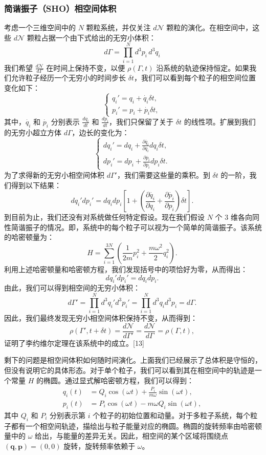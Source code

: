 \subsubsection{简谐振子（SHO）相空间体积}
考虑一个三维空间中的 \(N\) 颗粒系统，并仅关注 \(d\mathcal{N}\) 颗粒的演化。在相空间中，这些 \(d\mathcal{N}\) 颗粒占据一个由下式给出的无穷小体积：
\[
d\Gamma = \prod_{i=1}^{N} d^3p_i \, d^3q_i~
\]
我们希望 \( \frac{d\mathcal{N}}{d\Gamma} \) 在时间上保持不变，以便 \( \rho(\Gamma, t) \) 沿系统的轨迹保持恒定。如果我们允许粒子经历一个无穷小的时间步长 \( \delta t \)，我们可以看到每个粒子的相空间位置变化如下：
\[
\begin{cases}
q_i' = q_i + \dot{q_i} \delta t, \\
p_i' = p_i + \dot{p_i} \delta t,
\end{cases}~
\]
其中，\( \dot{q_i} \) 和 \( \dot{p_i} \) 分别表示 \( \frac{dq_i}{dt} \) 和 \( \frac{dp_i}{dt} \)，我们只保留了关于 \( \delta t \) 的线性项。扩展到我们的无穷小超立方体 \( d\Gamma \)，边长的变化为：
\[
\begin{cases}
dq_i' = dq_i + \frac{\partial \dot{q_i}}{\partial q_i} dq_i \delta t, \\
dp_i' = dp_i + \frac{\partial \dot{p_i}}{\partial p_i} dp_i \delta t.
\end{cases}~
\]
为了求得新的无穷小相空间体积 \( d\Gamma' \)，我们需要这些量的乘积。到 \( \delta t \) 的一阶，我们得到以下结果：
\[
dq_i' dp_i' = dq_i dp_i \left[1 + \left( \frac{\partial \dot{q_i}}{\partial q_i} + \frac{\partial \dot{p_i}}{\partial p_i} \right) \delta t \right].~
\]
到目前为止，我们还没有对系统做任何特定假设。现在我们假设 \( N \) 个 3 维各向同性简谐振子的情况。即，系统中的每个粒子可以视为一个简单的简谐振子。该系统的哈密顿量为：
\[
H = \sum_{i=1}^{3N} \left( \frac{1}{2m} p_i^2 + \frac{m\omega^2}{2} q_i^2 \right).~
\]
利用上述哈密顿量和哈密顿方程，我们发现括号中的项恰好为零，从而得出：
\[
dq_i' dp_i' = dq_i dp_i.~
\]
由此，我们可以得到相空间的无穷小体积：
\[
d\Gamma' = \prod_{i=1}^{N} d^3q_i' d^3p_i' = \prod_{i=1}^{N} d^3q_i d^3p_i = d\Gamma.~
\]
因此，我们最终发现无穷小相空间体积保持不变，从而得到：
\[
\rho(\Gamma', t + \delta t) = \frac{d\mathcal{N}}{d\Gamma'} = \frac{d\mathcal{N}}{d\Gamma} = \rho(\Gamma, t),~
\]
证明了李约维尔定理在该系统中的成立。[13]

剩下的问题是相空间体积如何随时间演化。上面我们已经展示了总体积是守恒的，但没有说明它的具体形态。对于单个粒子，我们可以看到其在相空间中的轨迹是一个常量 \( H \) 的椭圆。通过显式解哈密顿方程，我们可以得到：
\[
\begin{aligned}
q_i(t) &= Q_i \cos(\omega t) + \frac{P_i}{m\omega} \sin(\omega t), \\
p_i(t) &= P_i \cos(\omega t) - m\omega Q_i \sin(\omega t),
\end{aligned}~
\]
其中 \( Q_i \) 和 \( P_i \) 分别表示第 \(i\) 个粒子的初始位置和动量。对于多粒子系统，每个粒子都有一个相空间轨迹，描绘出与粒子能量对应的椭圆。椭圆的旋转频率由哈密顿量中的 \( \omega \) 给出，与能量的差异无关。因此，相空间的某个区域将围绕点 \( (\mathbf{q}, \mathbf{p}) = (0, 0) \) 旋转，旋转频率依赖于 \( \omega \)。